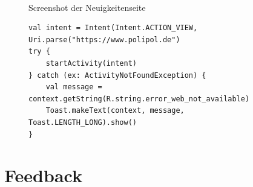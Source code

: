 \begin{figure}[!htb]
    \centering
    \begin{minipage}[t]{0.6\textwidth}
        \caption{Screenshot der Neuigkeitenseite}
        \\
        \label{fig:screenshot_news}
    \end{minipage}
\end{figure}

\begin{figure}[!htb]
    \begin{lstlisting}[caption=Aufruf des Browsers über das System, label=list:intent_website]
val intent = Intent(Intent.ACTION_VIEW, Uri.parse("https://www.polipol.de")
try {
    startActivity(intent)
} catch (ex: ActivityNotFoundException) {
    val message = context.getString(R.string.error_web_not_available)
    Toast.makeText(context, message, Toast.LENGTH_LONG).show()
}
    \end{lstlisting}
\end{figure}

\clearpage

\section{Feedback}
\label{sec:feedback}

